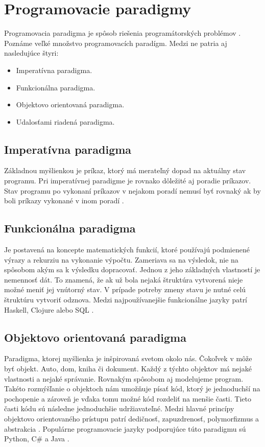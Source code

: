 \section{Programovacie paradigmy}
\noindent Programovacia paradigma je spôsob riešenia programátorských problémov \cite{Samuel2018AnII}. Poznáme veľké množstvo programovacích paradígm. Medzi ne patria aj nasledujúce štyri:
\begin{itemize}
  \item Imperatívna paradigma.
  \item Funkcionálna paradigma.
  \item Objektovo orientovaná paradigma.
  \item Udalosťami riadená paradigma.
\end{itemize}

\subsection{Imperatívna paradigma}
\noindent Základnou myšlienkou je príkaz, ktorý má merateľný dopad na aktuálny stav 
programu. Pri imperatívnej paradigme je rovnako dôležité aj poradie príkazov. Stav 
programu po vykonaní príkazov v nejakom poradí nemusí byť rovnaký ak by boli príkazy 
vykonané v inom poradí \cite{imperativParadigm}. 

\subsection{Funkcionálna paradigma}
\noindent Je postavená na koncepte matematických funkcií, ktoré používajú podmienené 
výrazy a rekurziu na vykonanie výpočtu. Zameriava sa na výsledok, nie na spôsobom akým 
sa k výsledku dopracovať. Jednou z jeho základných vlastností je nemennosť dát. To 
znamená, že ak už bola nejaká štruktúra vytvorená nieje možné meniť jej vnútorný stav. 
V prípade potreby zmeny stavu je nutné celú štruktúru vytvoriť odznova. Medzi 
najpoužívanejšie funkcionálne jazyky patrí Haskell, Clojure alebo SQL \cite{functionalParadigm}.

\subsection{Objektovo orientovaná paradigma}
\noindent Paradigma, ktorej myšlienka je inšpirovaná svetom okolo nás. Čokoľvek v môže 
byť objekt. Auto, dom, kniha či dokument. Každý z týchto objektov má nejaké vlastnosti 
a nejaké správanie. Rovnakým spôsobom aj modelujeme program. Takéto rozmýšľanie o 
objektoch nám umožňuje písať kód, ktorý je jednoduchší na pochopenie a zároveň je 
vďaka tomu možné kód rozdeliť na menšie časti. Tieto časti kódu sú následne 
jednoduchšie udržiavateľné. Medzi hlavné princípy objektovo orientovaného prístupu 
patrí dedičnosť, zapuzdrenosť, polymorfizmus a abstrakcia \cite{objectOrientedParadigm}
. Populárne programovacie jazyky podporujúce túto paradigmu sú Python, C\# a Java \cite
{stack-overflow-survey-2020}.

